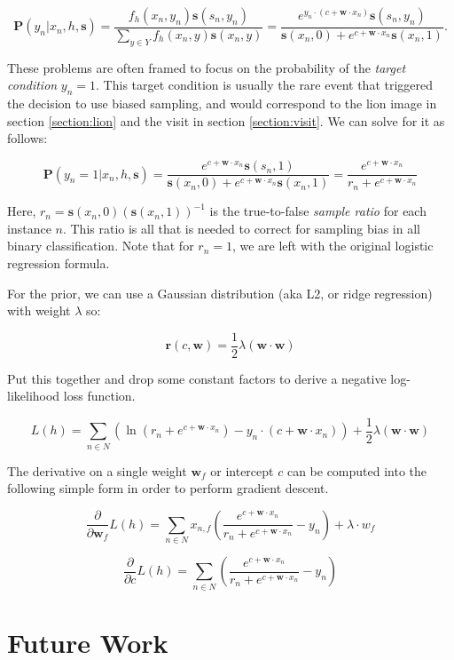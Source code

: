 \documentclass[twoside]{article}
\begin{document}
\[\mathbf{P}(y_n|x_n,h,\mathbf{s})=\frac{f_h(x_n,y_n)\mathbf{s}(s_n,y_n)}{\sum_{y \in Y}f_h(x_n,y)\mathbf{s}(x_n,y)}=\frac{e^{y_n \cdot (c+\mathbf{w} \cdot x_n)}\mathbf{s}(s_n,y_n)}{\mathbf{s}(x_n,0)+e^{c+\mathbf{w} \cdot x_n}\mathbf{s}(x_n,1)}.\]

These problems are often framed to focus on the probability of the \textit{target condition} \(y_n = 1\). This target condition is usually the rare event that triggered the decision to use biased sampling, and would correspond to the lion image in section \ref{section:lion} and the visit in section \ref{section:visit}. We can solve for it as follows:

\[\mathbf{P}(y_n=1|x_n,h,\mathbf{s})=\frac{e^{c+\mathbf{w} \cdot x_n}\mathbf{s}(s_n,1)}{\mathbf{s}(x_n,0)+e^{c+\mathbf{w} \cdot x_n}\mathbf{s}(x_n,1)}=\frac{e^{c+\mathbf{w} \cdot x_n}}{r_n+e^{c+\mathbf{w} \cdot x_n}} \]

Here, \(r_n = \mathbf{s}(x_n,0)(\mathbf{s}(x_n,1))^{-1}\) is the true-to-false \textit{sample ratio} for each instance \(n\). This ratio is all that is needed to correct for sampling bias in all binary classification. Note that for \(r_n=1\), we are left with the original logistic regression formula.

For the prior, we can use a Gaussian distribution (aka L2, or ridge regression) with weight \(\lambda\) so:

\[\mathbf{r}(c,\mathbf{w})=\frac{1}{2}\lambda(\mathbf{w} \cdot \mathbf{w})\]

Put this together and drop some constant factors to derive a negative log-likelihood loss function.

\[L(h)=\sum_{n \in  N} \left (\ln\left (r_n+e^{c+\mathbf{w} \cdot x_n}\right ) -y_n \cdot (c+\mathbf{w} \cdot x_n) \right )+ \frac{1}{2}\lambda(\mathbf{w} \cdot \mathbf{w})\]

The derivative on a single weight \(\mathbf{w}_f\) or intercept \(c\) can be computed into the following simple form in order to perform gradient descent.

\[\frac{\partial}{\partial \mathbf{w}_f }L(h)=\sum_{n \in  N} x_{n,f}\left(\frac{e^{c+\mathbf{w} \cdot x_n}}{r_n+e^{c+\mathbf{w} \cdot x_n}} -y_n  \right )+ \lambda \cdot w_f \]

\[\frac{\partial}{\partial c}L(h)=\sum_{n \in  N} \left(\frac{e^{c+\mathbf{w} \cdot x_n}}{r_n+e^{c+\mathbf{w} \cdot x_n}}  -y_n\right )\]

\section{Future Work}
\label{section:future_work}
\end{document}
